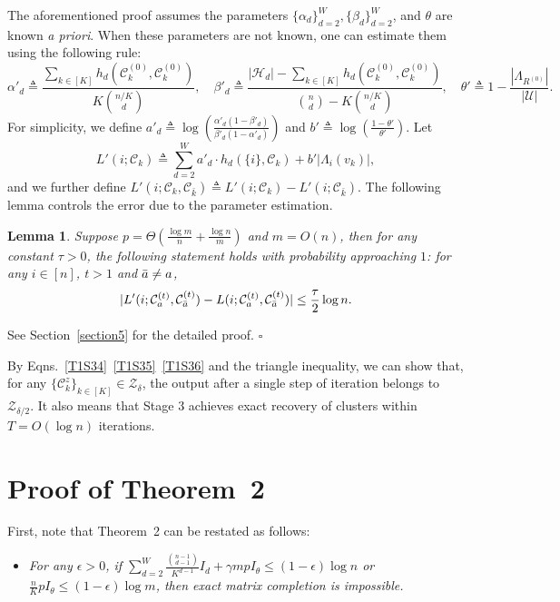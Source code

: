 \documentclass{article}
\newtheorem{lemma}{Lemma}
\newcommand\af{\alpha_d}
\newcommand\bt{\beta_d}
\newenvironment{proof}{{\noindent\it Proof:}\quad}{\hfill $\square$\par}
\begin{document}
The aforementioned proof assumes the parameters $\{\af\}_{d=2}^W, \{\bt\}_{d=2}^W$, and $\theta$ are known \emph{a priori}. When these parameters are not known, one can estimate them using the following rule:
$$
\alpha'_d \triangleq \frac{ \sum_{k\in [K]} h_d(\mathcal{C}_k^{(0)}, \mathcal{C}_k^{(0)})}{ K\binom{n/K}{d}}, \quad  \beta'_d \triangleq \frac{ |\mathcal{H}_d| - \sum_{k\in [K]} h_d(\mathcal{C}_k^{(0)}, \mathcal{C}_k^{(0)})}{ \binom{n}{d} - K \binom{n/K}{d}} , \quad  \theta' \triangleq 1 -\frac{|\Lambda_{R^{(0)}}|}{|\mathcal{U}|}.
$$
For simplicity, we define $a'_d \triangleq \log \left( \frac{\alpha'_d (1-\beta'_d)}{\beta'_d (1-\alpha'_d)} \right)$ and $b' \triangleq \log \left( \frac{1-\theta'}{\theta'} \right)$.
Let 
$$L'(i; \mathcal{C}_k) \triangleq \sum_{d=2}^{W} a'_d \cdot h_d(\{i\}, \mathcal{C}_k) + b' |\Lambda_i(v_k)|,$$ and we further define $L'(i; \mathcal{C}_k, \mathcal{C}_{\bar{k}}) \triangleq L'(i;\mathcal{C}_k) - L'(i;\mathcal{C}_{\bar{k}})$. The following lemma controls the error due to the parameter estimation.

\begin{lemma}\label{lemma7}
    Suppose $p=\Theta \left( \frac{\log m}{n} + \frac{\log n}{m} \right)$ and $m=O(n)$, then for any constant $\tau > 0$, the following statement holds with probability approaching $1$: for any $i \in [n]$, $t>1$ and $\Bar{a} \neq a$,
    \begin{equation}\label{T1S36}
        |L'(i; \mathcal{C}^{(t)}_a, \mathcal{C}^{(t)}_{\Bar{a}}) - L(i; \mathcal{C}^{(t)}_a, \mathcal{C}^{(t)}_{\Bar{a}})| \leq \frac{\tau}{2} \log n.
    \end{equation}
\end{lemma}
\begin{proof}
    See Section~\ref{section5} for the detailed proof.
\end{proof}
By Eqns.~\eqref{T1S34}~\eqref{T1S35}~\eqref{T1S36} and the triangle inequality, we can show that, for any $\{ \mathcal{C}^z_k \}_{k \in [K]} \in \mathcal{Z}_{\delta}$, the output after a single step of iteration belongs to $\mathcal{Z}_{\delta / 2}$. It also means that Stage 3 achieves exact recovery of clusters within $T=O(\log n)$ iterations.




\section{Proof of Theorem~2}\label{section4}
First, note that Theorem~2 can be restated as follows:
\begin{itemize}
    \item \emph{For any $\epsilon > 0$, if $ \sum_{d=2}^{W} \frac{\binom{n-1}{d-1}}{K^{d-1}} I_d + \gamma m p I_\theta \leq (1-\epsilon) \log n$ or $\frac{n}{K} p I_\theta \leq (1-\epsilon) \log m$, then exact matrix completion is impossible.}
\end{itemize}
\end{document}
